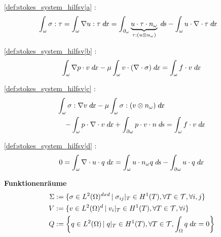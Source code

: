 \begin{itemize}
    \begin{item} \eqref{def:stokes_system_hilfsv|a} :
        \begin{align}
            \int_\omega \sigma : \tau = \int_\omega \nabla u : \tau \;d\hspace{-1.25pt} x &= 
                \int_{\partial_\omega} \underbrace{u \cdot \tau \cdot n_\omega}_{\tau : ( u \otimes u_\omega )} \;d\hspace{-1.25pt} s - \int_\omega u \cdot \nabla\cdot \tau \;d\hspace{-1.25pt} x 
        \end{align}
    \end{item}
    
    \begin{item} \eqref{def:stokes_system_hilfsv|b} :
        \begin{align}
            \int_\omega \nabla p \cdot v \;d\hspace{-1.25pt} x - \mu  \int_\omega v \cdot ( \nabla \cdot \sigma) \;d\hspace{-1.25pt} x 
                = \int_\omega f \cdot v \;d\hspace{-1.25pt} x                 
        \end{align}
    \end{item}
    
    \begin{item} \eqref{def:stokes_system_hilfsv|c} :
        \begin{align}
            \int_\omega \sigma : \nabla v \;d\hspace{-1.25pt} x - \mu  \int_\omega \sigma : (v \otimes n_\omega) \;d\hspace{-1.25pt} x 
                 & \notag \\
            - \int_\omega p \cdot \nabla \cdot v \;d\hspace{-1.25pt} x + \int_{\partial\omega } p \cdot v \cdot n \;d\hspace{-1.25pt} s &= \int_\omega f \cdot v \;d\hspace{-1.25pt} x                 
        \end{align}
    \end{item}
    
    \begin{item} \eqref{def:stokes_system_hilfsv|d} :
        \begin{align}
            0 = \int_\omega \nabla \cdot u \cdot q \;d\hspace{-1.25pt} x = \int_\omega u \cdot n_\omega q \;d\hspace{-1.25pt} s 
                - \int_{\partial \omega} u \cdot q \;d\hspace{-1.25pt} x 
        \end{align}
    \end{item}
\end{itemize}

\begin {definition}\textbf{Funktionenräume}\label{def:kont_funk_r�ume}
    \begin{align}
        \Sigma &:= \{\sigma \in L^2(\Omega)^{dxd} \,\lvert\; \sigma_{ij}|_T \in H^1(T), \forall T \in \mathcal{T} ,\forall i,j\} \\
        V &:= \{v \in L^2(\Omega)^{d} \,\lvert\; v_{i} |_T \in H^1(T), \forall T \in \mathcal{T} ,\forall i\} \\
        Q &:= \left\{ q \in L^2(\Omega) \,\lvert\; q |_T \in H^1(T), \forall T \in \mathcal{T} ,\int_\Omega q \;d\hspace{-1.25pt} x = 0\right\} 
    \end{align}    
\end {definition}

